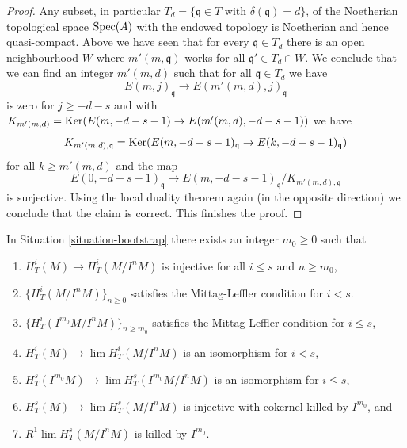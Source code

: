 \begin{proof}
\medskip\noindent
Any subset, in particular
$T_d = \{\mathfrak q \in T \text{ with }\delta(\mathfrak q) = d\}$,
of the Noetherian topological space $\mathop{\mathrm{Spec}}(A)$
with the endowed topology is Noetherian and hence quasi-compact.
Above we have seen that for every $\mathfrak q \in T_d$
there is an open neighbourhood $W$ where
$m'(m, \mathfrak q)$ works for all $\mathfrak q' \in T_d \cap W$.
We conclude that we can find an integer $m'(m, d)$ such that for all
$\mathfrak q \in T_d$ we have
$$
E(m, j)_\mathfrak q \to E(m'(m, d), j)_\mathfrak q
$$
is zero for $j \geq -d - s$ and with
$K_{m'(m, d)} = \mathop{\mathrm{Ker}}(E(m, -d - s - 1) \to E(m'(m, d), -d - s - 1))$
we have
$$
K_{m'(m, d), \mathfrak q} =
\mathop{\mathrm{Ker}}(E(m, -d - s - 1)_{\mathfrak q} \to E(k, -d - s - 1)_{\mathfrak q})
$$
for all $k \geq m'(m, d)$ and the map
$$
E(0, -d - s - 1)_\mathfrak q \to
E(m, -d - s - 1)_\mathfrak q/K_{m'(m, d), \mathfrak q}
$$
is surjective. Using the local duality theorem again (in the opposite
direction) we conclude that the claim is correct. This finishes the proof.
\end{proof}

\begin{lemma}
\label{lemma-final-bootstrap}
In Situation \ref{situation-bootstrap} there exists an integer $m_0 \geq 0$
such that
\begin{enumerate}
\item $H^i_T(M) \to H^i_T(M/I^nM)$ is injective for all $i \leq s$
and $n \geq m_0$,
\item $\{H^i_T(M/I^nM)\}_{n \geq 0}$
satisfies the Mittag-Leffler condition for $i < s$.
\item $\{H^i_T(I^{m_0}M/I^nM)\}_{n \geq m_0}$
satisfies the Mittag-Leffler condition for $i \leq s$,
\item $H^i_T(M) \to \lim H^i_T(M/I^nM)$
is an isomorphism for $i < s$,
\item $H^s_T(I^{m_0}M) \to \lim H^s_T(I^{m_0}M/I^nM)$
is an isomorphism for $i \leq s$,
\item $H^s_T(M) \to \lim H^s_T(M/I^nM)$ is
injective with cokernel killed by $I^{m_0}$, and
\item $R^1\lim H^s_T(M/I^nM)$ is killed by $I^{m_0}$.
\end{enumerate}
\end{lemma}

